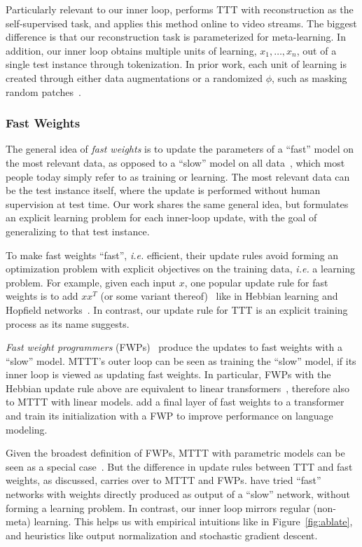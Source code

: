 \documentclass{article} %
\begin{document}
Particularly relevant to our inner loop, \cite{ttt-mae} performs TTT with reconstruction as the self-supervised task, and \cite{wang2023test} applies this method online to video streams.
The biggest difference is that our reconstruction task is parameterized for meta-learning.
In addition, our inner loop obtains multiple units of learning, $x_1,\dots,x_n$, out of a single test instance through tokenization. 
In prior work, each unit of learning is created through either data augmentations or a randomized $\phi$, such as masking random patches~\citep{mae}.

\subsubsection{Fast Weights}
\label{subsubsec:fw}

The general idea of \emph{fast weights} is to update the parameters of a ``fast'' model on the most relevant data, as opposed to a ``slow'' model on all data~\citep{hinton1987using, tieleman2009using}, which most people today simply refer to as training or learning.
The most relevant data can be the test instance itself, where the update is performed without human supervision at test time.
Our work shares the same general idea, but formulates an explicit learning problem for each inner-loop update, with the goal of generalizing to that test instance. 

To make fast weights ``fast'', \textit{i.e.} efficient, their update rules avoid forming an optimization problem with explicit objectives on the training data, \textit{i.e.} a learning problem.
For example, given each input $x$, one popular update rule for fast weights is to add $xx^T$ (or some variant thereof)~\citep{ba2016using} like in Hebbian learning and Hopfield networks~\citep{hopfield1982neural}.
In contrast, our update rule for TTT is an explicit training process as its name suggests.

\emph{Fast weight programmers} (FWPs)~\citep{schmidhuber1992learning} produce the updates to fast weights with a ``slow'' model.
MTTT's outer loop can be seen as training the ``slow'' model, if its inner loop is viewed as updating fast weights.
In particular, FWPs with the Hebbian update rule above are equivalent to linear transformers~\citep{schlag2021linear}, therefore also to MTTT with linear models.
\cite{clark2022meta} add a final layer of fast weights to a transformer and train its initialization with a FWP to improve performance on language modeling.

Given the broadest definition of FWPs, MTTT with parametric models can be seen as a special case~\citep{kirsch2021meta}.
But the difference in update rules between TTT and fast weights, as discussed, carries over to MTTT and FWPs.
\cite{irie2021going} have tried ``fast'' networks with weights directly produced as output of a ``slow'' network, without forming a learning problem.
In contrast, our inner loop mirrors regular (non-meta) learning. This helps us with empirical intuitions like in Figure~\ref{fig:ablate}, and heuristics like output normalization and stochastic gradient descent.
\end{document}
